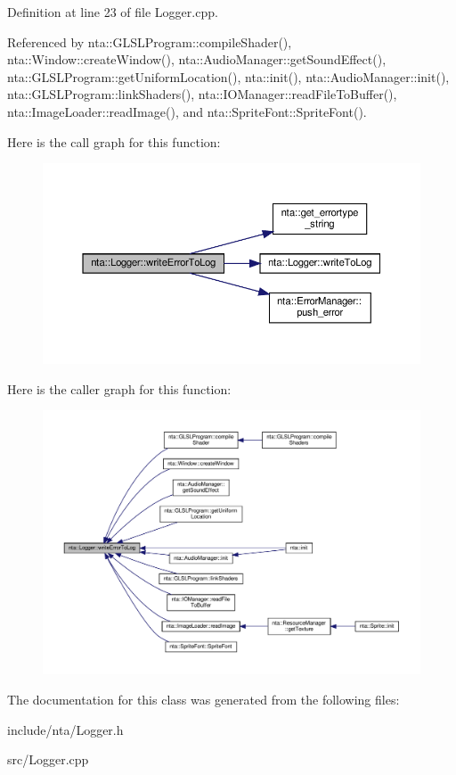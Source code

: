 Definition at line 23 of file Logger.\+cpp.



Referenced by nta\+::\+G\+L\+S\+L\+Program\+::compile\+Shader(), nta\+::\+Window\+::create\+Window(), nta\+::\+Audio\+Manager\+::get\+Sound\+Effect(), nta\+::\+G\+L\+S\+L\+Program\+::get\+Uniform\+Location(), nta\+::init(), nta\+::\+Audio\+Manager\+::init(), nta\+::\+G\+L\+S\+L\+Program\+::link\+Shaders(), nta\+::\+I\+O\+Manager\+::read\+File\+To\+Buffer(), nta\+::\+Image\+Loader\+::read\+Image(), and nta\+::\+Sprite\+Font\+::\+Sprite\+Font().

Here is the call graph for this function\+:\nopagebreak
\begin{figure}[H]
\begin{center}
\leavevmode
\includegraphics[width=350pt]{d6/d0d/classnta_1_1Logger_a22e0cfbb0e04de2c377cdd5297c39eee_cgraph}
\end{center}
\end{figure}
Here is the caller graph for this function\+:\nopagebreak
\begin{figure}[H]
\begin{center}
\leavevmode
\includegraphics[width=350pt]{d6/d0d/classnta_1_1Logger_a22e0cfbb0e04de2c377cdd5297c39eee_icgraph}
\end{center}
\end{figure}


The documentation for this class was generated from the following files\+:\begin{DoxyCompactItemize}
\item 
include/nta/Logger.\+h\item 
src/Logger.\+cpp\end{DoxyCompactItemize}
